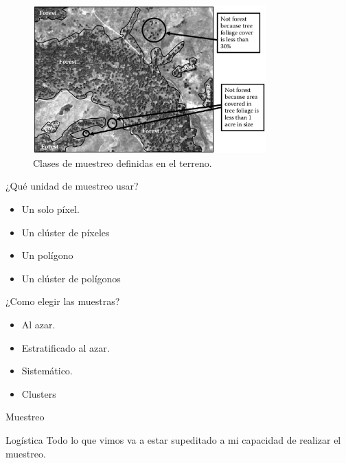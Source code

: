 \documentclass[]{beamer}
\begin{document}
\begin{frame}{\subsecname}
  \begin{figure}
  \includegraphics[width=0.8\textwidth]{imagenes/unidad_mapa.png}
  \caption{Clases de muestreo definidas en el terreno.}
  \end{figure}
\end{frame}

\begin{frame}{\subsecname}
  \begin{block}{¿Qué unidad de muestreo usar?}
    \begin{itemize}[<+>]
      \item Un solo píxel.
      \item Un clúster de píxeles
      \item Un polígono
      \item Un clúster de polígonos
    \end{itemize}
  \end{block}
\end{frame}

\begin{frame}{\subsecname}
  \begin{block}{¿Como elegir las muestras?}
    \begin{itemize}[<+>]
      \item Al azar.
      \item Estratificado al azar.
      \item Sistemático.
      \item Clusters
    \end{itemize}
  \end{block}
\end{frame}

\begin{frame}{Muestreo}
  \begin{alertblock}{Logística}
    Todo lo que vimos va a estar supeditado a mi capacidad de realizar el muestreo.
  \end{alertblock}
\end{frame}
\end{document}
